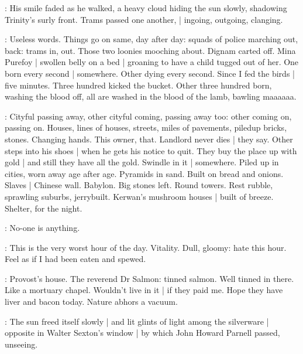 :
His smile faded as he walked,
a heavy cloud hiding the sun slowly,
shadowing Trinity's surly front.
Trams passed one another, |
ingoing,
outgoing,
clanging.

\BloomInt:
Useless words.
Things go on same,
day after day:
squads of police marching out,
back:
trams in,
out.
Those two loonies mooching about.
Dignam carted off.
Mina Purefoy |
swollen belly on a bed |
groaning to have a child tugged out of her.
One born every second |
somewhere.
Other dying every second.
Since I fed the birds |
five minutes.
Three hundred kicked the bucket.
Other three hundred born,
washing the blood off,
all are washed in the blood of the lamb,
bawling maaaaaa.

\BloomInt:
Cityful passing away,
other cityful coming,
passing away too:
other coming on,
passing on.
Houses, lines of houses,
streets,
miles of pavements,
piledup bricks,
stones.
Changing hands.
This owner,
that.
Landlord never dies |
they say.
Other steps into his shoes |
when he gets his notice to quit.
They buy the place up with gold |
and still they have all the gold.
Swindle in it |
somewhere.
Piled up in cities,
worn away age after age.
Pyramids in sand.
Built on bread and onions.
Slaves |
Chinese wall.
Babylon.
Big stones left.
Round towers.
Rest rubble,
sprawling suburbs,
jerrybuilt.
Kerwan's mushroom houses |
built of breeze.
Shelter,
for the night.

\BloomInt:
No-one is anything.

\BloomInt:
This is the very worst hour of the day.
Vitality.
Dull, gloomy:
hate this hour.
Feel as if I had been eaten and spewed.

\BloomInt:
Provost's house.
The reverend Dr Salmon:
tinned salmon.
Well tinned in there.
Like a mortuary chapel.
Wouldn't live in it |
if they paid me.
Hope they have liver and bacon today.
Nature abhors a vacuum.

:
The sun freed itself slowly |
and lit glints of light among the silverware |
opposite in Walter Sexton's window |
by which John Howard Parnell passed,
unseeing.

